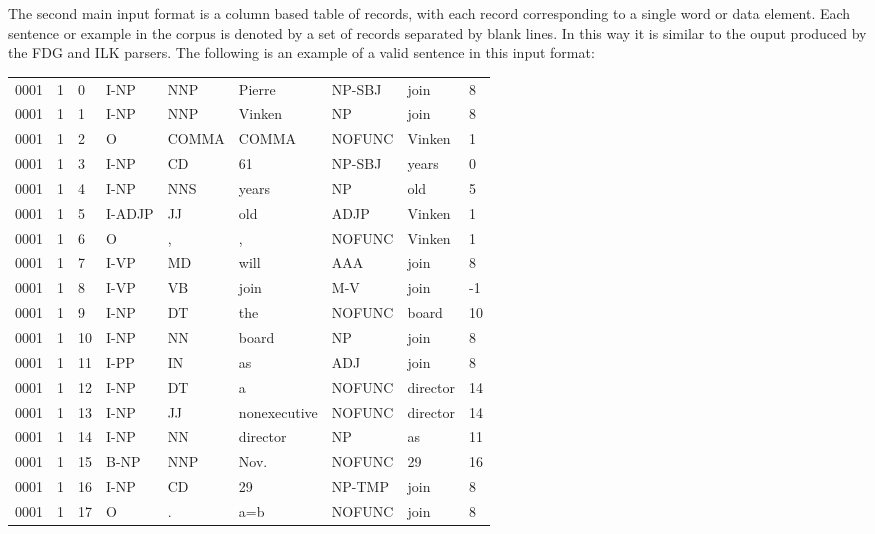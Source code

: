 \documentclass[11pt]{article}
\begin{document}
The second main input format is a column based table of records, with each
record corresponding to a single word or data element.  Each sentence or example
in the corpus is denoted by a set of records separated by blank lines.  In this
way it is similar to the ouput produced by the FDG and ILK parsers.  The
following is an example of a valid sentence in this input format:
\begin{tabular}{@{}lllllllll}
0001 &1  & 0    &  I-NP &  NNP   &      Pierre    &NP-SBJ    &    join   & 8 \\
0001 &1  & 1    &  I-NP &  NNP   &      Vinken    &    NP    &    join   & 8 \\
0001 &1  & 2    &     O &COMMA   &       COMMA    &NOFUNC    &  Vinken   & 1 \\
0001 &1  & 3    &  I-NP &   CD   &          61    &NP-SBJ    &   years   & 0 \\
0001 &1  & 4    &  I-NP &  NNS   &       years    &    NP    &     old   & 5 \\
0001 &1  & 5    &I-ADJP &   JJ   &         old    &  ADJP    &  Vinken   & 1 \\
0001 &1  & 6    &     O &    ,   &           ,    &NOFUNC    &  Vinken   & 1 \\
0001 &1  & 7    &  I-VP &   MD   &        will    &   AAA    &    join   & 8 \\
0001 &1  & 8    &  I-VP &   VB   &        join    &   M-V    &    join   &-1 \\ 
0001 &1  & 9    &  I-NP &   DT   &         the    &NOFUNC    &   board   &10 \\
0001 &1  &10    &  I-NP &   NN   &       board    &    NP    &    join   & 8 \\
0001 &1  &11    &  I-PP &   IN   &          as    &   ADJ    &    join   & 8 \\  
0001 &1  &12    &  I-NP &   DT   &           a    &NOFUNC    &director   &14 \\
0001 &1  &13    &  I-NP &   JJ   &nonexecutive    &NOFUNC    &director   &14 \\
0001 &1  &14    &  I-NP &   NN   &    director    &    NP    &      as   &11 \\
0001 &1  &15    &  B-NP &  NNP   &        Nov.    &NOFUNC    &      29   &16 \\
0001 &1  &16    &  I-NP &   CD   &          29    &NP-TMP    &    join   & 8 \\
0001 &1  &17    &     O &    .   &         a=b    &NOFUNC    &    join   & 8 \\
\end{tabular}
\end{document}
